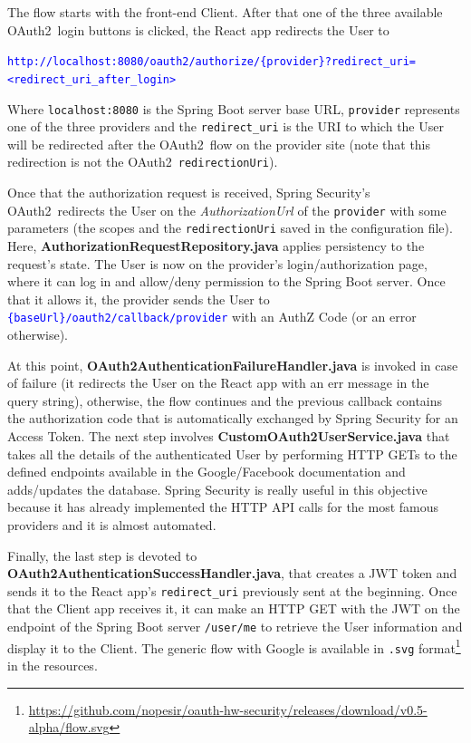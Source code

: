 \documentclass[a4paper,12pt]{article}
\def\oauth{OAuth2\xspace}
\begin{document}
The flow starts with the front-end Client. After that one of the three available \oauth\ login buttons is clicked, the React app redirects the User to \\

\vspace{0.1cm}

\hypertarget{foo}{}

\quad \textcolor{blue}{\texttt{\footnotesize{http://localhost:8080/oauth2/authorize/\{provider\}?redirect\_uri=<redirect\_uri\_after\_login>}}} \\

\vspace{0.1cm}

Where \texttt{localhost:8080} is the Spring Boot server base URL, \texttt{provider} represents one of the three providers and the \texttt{redirect\_uri} is the URI to which the User will be redirected after the \oauth\ flow on the provider site (note that this redirection is not the \oauth\ \texttt{redirectionUri}).

Once that the authorization request is received, Spring Security's \oauth\ redirects the User on the \textit{AuthorizationUrl} of the \texttt{provider} with some parameters (the scopes and the \texttt{redirectionUri} saved in the configuration file). Here, \textbf{AuthorizationRequestRepository.java} applies persistency to the request's state. The User is now on the provider's login/authorization page, where it can log in and allow/deny permission to the Spring Boot server. Once that it allows it, the provider sends the User to \textcolor{blue}{\texttt{\{baseUrl\}/oauth2/callback/provider}} with an AuthZ Code (or an error otherwise).

At this point, \textbf{OAuth2AuthenticationFailureHandler.java} is invoked in case of failure (it redirects the User on the React app with an err message in the query string), otherwise, the flow continues and the previous callback contains the authorization code that is automatically exchanged by Spring Security for an Access Token. The next step involves \textbf{CustomOAuth2UserService.java} that takes all the details of the authenticated User by performing HTTP GETs to the defined endpoints available in the Google/Facebook documentation and adds/updates the database. Spring Security is really useful in this objective because it has already implemented the HTTP API calls for the most famous providers and it is almost automated. 

Finally, the last step is devoted to \textbf{OAuth2AuthenticationSuccessHandler.java}, that creates a JWT token and sends it to the React app's \texttt{redirect\_uri} previously sent at the beginning. Once that the Client app receives it, it can make an HTTP GET with the JWT on the endpoint of the Spring Boot server \texttt{/user/me} to retrieve the User information and display it to the Client. The generic flow with Google is available in \texttt{.svg} format\footnote{\url{https://github.com/nopesir/oauth-hw-security/releases/download/v0.5-alpha/flow.svg}} in the resources.
\end{document}
